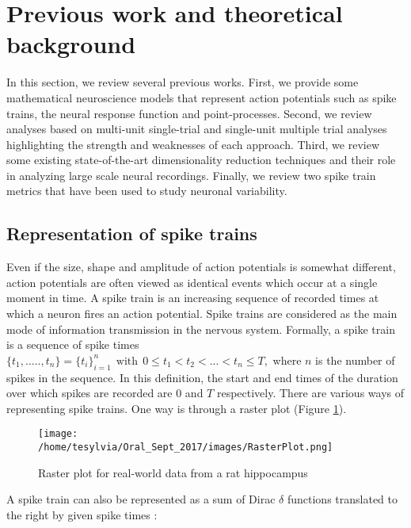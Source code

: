 
\section{Previous work and theoretical background}
In this section, we review several previous works.
First, we provide some mathematical neuroscience models that represent action potentials such as spike trains, the neural response function and point-processes. Second, we review analyses based on multi-unit single-trial and single-unit multiple trial analyses highlighting the strength and weaknesses of each approach. Third, we review some existing state-of-the-art dimensionality
reduction techniques and their role in analyzing large scale neural recordings.
Finally, we review two spike train metrics that have been used to study neuronal
variability.

\subsection{Representation of spike trains}
Even if the size, shape and amplitude of action potentials is somewhat different,
action potentials are often viewed as identical events which occur at a single moment in time. A spike train is an increasing sequence of recorded times at which a neuron fires an action potential. Spike trains are considered as the main mode of information transmission in the nervous system.
Formally, a spike train is a sequence of spike times
$\displaystyle  \{t_{1}, ....., t_{n} \} = \{t_{i}\}_{i=1}^{n} \ \ 
 \text{with} \ \  0 \leq t_{1} < t_{2}< ... < t_{n} \leq T,$
 where $n$ is the number of spikes in the sequence.
In this definition, the start and end times of the duration over which spikes are recorded are $0$ and $T$ respectively. There are various ways of representing spike trains. One way is through a raster plot (Figure \ref{fig:Raster}).\\
 
 \begin{figure}[H]
  \centering
    \texttt{[image: /home/tesylvia/Oral\_Sept\_2017/images/RasterPlot.png]}
     \caption{Raster plot for real-world data from a rat hippocampus}
      \label{fig:Raster}
\end{figure}

A spike train can also be represented as a sum of Dirac $\delta$ functions translated to the right by given spike times \cite{Dayan2001}:

